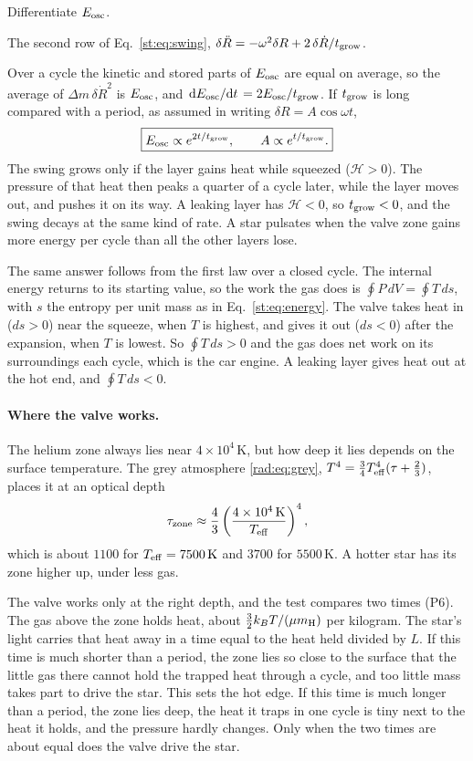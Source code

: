 \begin{explain}
	\item Differentiate $E_{\rm osc}$.
	\item The second row of Eq.~\eqref{st:eq:swing}, $\delta\ddot R=-\omega^2\delta R+2\,\delta\dot R/t_{\rm grow}$.
\end{explain}
Over a cycle the kinetic and stored parts of $E_{\rm osc}$ are equal on average, so the average of $\Delta m\,\delta\dot R^2$ is $E_{\rm osc}$, and $\dv*{E_{\rm osc}}{t}=2E_{\rm osc}/t_{\rm grow}$. If $t_{\rm grow}$ is long compared with a period, as assumed in writing $\delta R=A\cos\omega t$,
\begin{equation}
	\boxed{E_{\rm osc}\propto e^{2t/t_{\rm grow}},\qquad A\propto e^{t/t_{\rm grow}}.}
	\label{st:eq:growth}
\end{equation}
The swing grows only if the layer gains heat while squeezed ($\mathcal H>0$). The pressure of that heat then peaks a quarter of a cycle later, while the layer moves out, and pushes it on its way. A leaking layer has $\mathcal H<0$, so $t_{\rm grow}<0$, and the swing decays at the same kind of rate. A star pulsates when the valve zone gains more energy per cycle than all the other layers lose.

The same answer follows from the first law over a closed cycle. The internal energy returns to its starting value, so the work the gas does is $\oint P\,dV=\oint T\,ds$, with $s$ the entropy per unit mass as in Eq.~\eqref{st:eq:energy}. The valve takes heat in ($ds>0$) near the squeeze, when $T$ is highest, and gives it out ($ds<0$) after the expansion, when $T$ is lowest. So $\oint T\,ds>0$ and the gas does net work on its surroundings each cycle, which is the car engine. A leaking layer gives heat out at the hot end, and $\oint T\,ds<0$.

\paragraph{Where the valve works.} The helium zone always lies near $4\times10^4\,\mathrm K$, but how deep it lies depends on the surface temperature. The grey atmosphere \eqref{rad:eq:grey}, $T^4=\tfrac34T_{\rm eff}^4(\tau+\tfrac23)$, places it at an optical depth
\[
\tau_{\rm zone}\approx\frac43\left(\frac{4\times10^4\,\mathrm K}{T_{\rm eff}}\right)^4 ,
\]
which is about $1100$ for $T_{\rm eff}=7500\,\mathrm K$ and $3700$ for $5500\,\mathrm K$. A hotter star has its zone higher up, under less gas.

The valve works only at the right depth, and the test compares two times (P6). The gas above the zone holds heat, about $\tfrac32k_BT/(\mu m_{\rm H})$ per kilogram. The star's light carries that heat away in a time equal to the heat held divided by $L$. If this time is much shorter than a period, the zone lies so close to the surface that the little gas there cannot hold the trapped heat through a cycle, and too little mass takes part to drive the star. This sets the hot edge. If this time is much longer than a period, the zone lies deep, the heat it traps in one cycle is tiny next to the heat it holds, and the pressure hardly changes. Only when the two times are about equal does the valve drive the star.

